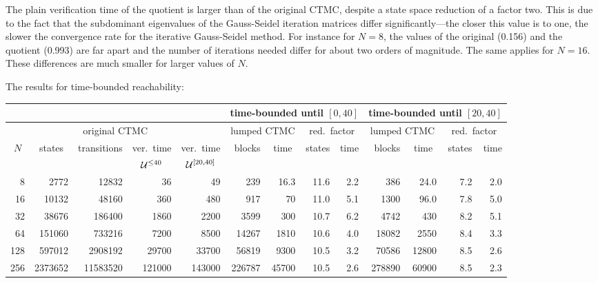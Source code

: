 \documentclass{llncs}
\begin{document}
%
\noindent The plain verification time of the quotient is larger than of the 
original CTMC, despite a state space reduction of a factor two. 
This is due to the fact that the subdominant eigenvalues of the Gauss-Seidel iteration matrices differ significantly---the closer
this value is to one, the slower the convergence rate for the iterative Gauss-Seidel 
method.
For instance for $N = 8$, the values of the original (0.156) and the quotient (0.993)
are far apart and the number of iterations needed differ for about two orders of magnitude.  
The same applies for $N = 16$.  These differences are much smaller for larger values of $N$.

The results for time-bounded reachability:
{\scriptsize
\begin{center}
\begin{tabular}{|r|r|r|r|r|r|r|r|r|r|r|r|r|}
\hline 
  \multicolumn{5}{|c|}{} & \multicolumn{4}{c|}{time-bounded until $[0,40]$}
  & \multicolumn{4}{c|}{time-bounded until $[20,40]$} \\ \hline
  \multicolumn{5}{|c|}{original CTMC} & \multicolumn{2}{c|}{lumped CTMC}  
  & \multicolumn{2}{c|}{red.\ factor}  & \multicolumn{2}{c|}{lumped CTMC}  
  & \multicolumn{2}{c|}{red.\ factor}\\[1ex] \hline
\multicolumn{1}{|c|}{$N$} & \multicolumn{1}{c|}{states} &transitions&ver.\ time&ver.\ time&blocks& \multicolumn{1}{c|}{time} &states& time& blocks& \multicolumn{1}{c|}{time} &states& time \\
   &         &    & \multicolumn{1}{c|}{$\mathrel{\mathcal{U}}^{\leq 40}$} & \multicolumn{1}{c|}{$\mathrel{\mathcal{U}}^{[20,40]}$} & &              &      &     &       &                 &     & \\ \hline
  8&    2772 &    12832 &     36 &    49&   239&   16.3          & 11.6 & 2.2 &   386 &   24.0          & 7.2 & 2.0\\
 16&   10132 &    48160 &    360 &   480&   917&   70\phantom{.0}& 11.0 & 5.1 &  1300 &   96.0          & 7.8 & 5.0  \\
 32&   38676 &   186400 &   1860 &  2200&  3599&  300\phantom{.0}& 10.7 & 6.2 &  4742 &  430\phantom{.0}& 8.2 & 5.1 \\
 64&  151060 &   733216 &   7200 &  8500& 14267& 1810\phantom{.0}& 10.6 & 4.0 & 18082 & 2550\phantom{.0}& 8.4 & 3.3 \\
128&  597012 &  2908192 &  29700 & 33700& 56819& 9300\phantom{.0}& 10.5 & 3.2 & 70586 &12800\phantom{.0}& 8.5 & 2.6 \\
256& 2373652 & 11583520 & 121000 &143000&226787&45700\phantom{.0}& 10.5 & 2.6 &278890 &60900\phantom{.0}& 8.5 & 2.3 \\ \hline
\end{tabular} \end{center} }
\end{document}
